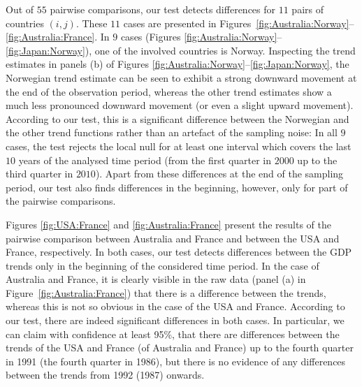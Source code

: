 \documentclass[12pt]{article}
\begin{document}
Out of $55$ pairwise comparisons, our test detects differences for $11$ pairs of countries $(i,j)$. These $11$ cases are presented in Figures~\ref{fig:Australia:Norway}--\ref{fig:Australia:France}. In $9$ cases (Figures \ref{fig:Australia:Norway}--\ref{fig:Japan:Norway}), one of the involved countries is Norway. Inspecting the trend estimates in panels (b) of Figures \ref{fig:Australia:Norway}--\ref{fig:Japan:Norway}, the Norwegian trend estimate can be seen to exhibit a strong downward movement at the end of the observation period, whereas the other trend estimates show a much less pronounced downward movement (or even a slight upward movement). According to our test, this is a significant difference between the Norwegian and the other trend functions rather than an artefact of the sampling noise: In all $9$ cases, the test rejects the local null for at least one interval which covers the last $10$ years of the analysed time period (from the first quarter in $2000$ up to the third quarter in $2010$). Apart from these differences at the end of the sampling period, our test also finds differences in the beginning, however, only for part of the pairwise comparisons. 


Figures \ref{fig:USA:France} and \ref{fig:Australia:France} present the results of the pairwise comparison between Australia and France and between the USA and France, respectively. In both cases, our test detects differences between the GDP trends only in the beginning of the considered time period. In the case of Australia and France, it is clearly visible in the raw data (panel (a) in Figure~\ref{fig:Australia:France}) that there is a difference between the trends, whereas this is not so obvious in the case of the USA and France. According to our test, there are indeed significant differences in both cases. In particular, we can claim with confidence at least 95\%, that there are differences between the trends of the USA and France (of Australia and France) up to the fourth quarter in 1991 (the fourth quarter in 1986), but there is no evidence of any differences between the trends from 1992 (1987) onwards.
\end{document}
